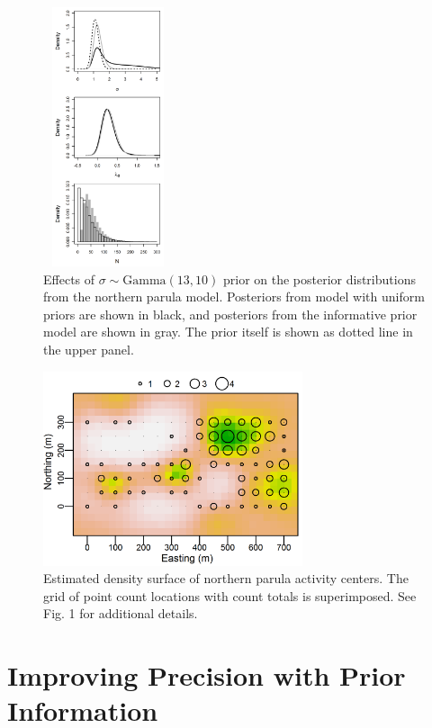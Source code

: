 \begin{figure}
  \centering
  \includegraphics[width=1.5in,height=3in]{Ch14/figs/prior} %
  \caption{Effects of $\sigma \sim \mbox{Gamma}(13,10)$
    prior on the posterior distributions from the northern parula
    model. Posteriors from model with uniform priors are
    shown in black, and posteriors from the informative prior model
    are shown in gray. The prior itself is shown as dotted line in the
    upper panel.}
  \label{fig:prior}
\end{figure}




\begin{figure}
  \centering
  \includegraphics[width=3in,height=2.25in]{Ch14/figs/nopaDen}
  \caption{Estimated density surface of northern parula activity
    centers. The grid of point count locations with count totals is
    superimposed. See Fig. 1 for additional details.  }
  \label{fig:nopaDen}
\end{figure}




\section{Improving Precision with Prior Information}
\label{Sect.precision}

